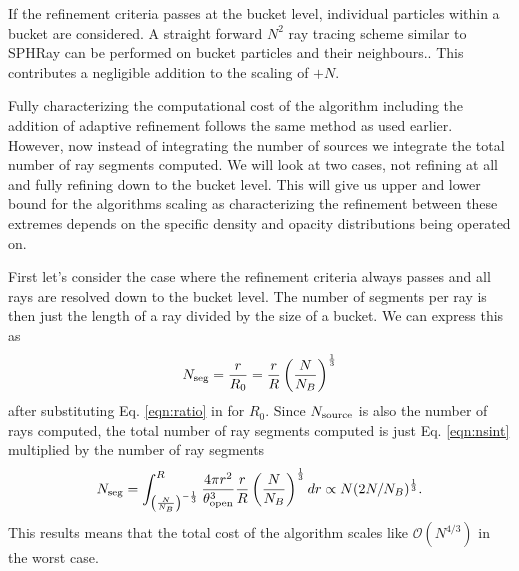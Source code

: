 \documentclass[fleq,usenatbib]{mnras}
\newcommand{\bigO}[1]{\mathcal{O}\left(#1\right)}
\newcommand{\NS}{N_{\rm source}}
\newcommand{\tO}{\theta_{\rm open}}
\begin{document}
If the refinement criteria passes at the bucket level, individual particles 
within a bucket are considered. A straight forward $N^2$ ray tracing scheme 
similar to SPHRay \citep{altayEt08} can be performed on bucket particles and 
their neighbours.. This contributes a negligible addition to the scaling of 
$+N$.

Fully characterizing the computational cost of the algorithm including the 
addition of adaptive refinement follows the same method as used earlier. 
However, now instead of integrating the number of sources we integrate the 
total number of ray segments computed. We will look at two cases, not refining 
at all and fully refining down to the bucket level. This will give us upper 
and lower bound for the algorithms scaling as characterizing the refinement 
between these extremes depends on the specific density and opacity 
distributions being operated on.

First let's consider the case where the refinement criteria always passes and 
all rays are resolved down to the bucket level. The number of segments per ray 
is then just the length of a ray divided by the size of a bucket. We can 
express this as
\begin{equation}
\label{eqn:nseg}
N_{\rm seg} = \frac{r}{R_0} = \frac{r}{R}\left(\frac{N}{N_B}\right)^\frac{1}{3}
\end{equation}
after substituting Eq. \ref{eqn:ratio} in for $R_0$. Since $\NS$ is also the 
number of rays computed, the total number of ray segments computed is just Eq. 
\ref{eqn:nsint} multiplied by the number of ray segments
\begin{equation}
\label{eqn:nsegint}
N_{\rm seg} = \int_{\left(\frac{N}{N_B}\right)^{-\frac{1}{3}}}^R 
\frac{4\pi r^2}{\tO^3}
\frac{r}{R}\left(\frac{N}{N_B}\right)^\frac{1}{3} dr
\propto N(2N/N_B)^\frac{1}{3}.
\end{equation}
This results means that the total cost of the algorithm scales like 
$\bigO{N^{4/3}}$ in the worst case.
\end{document}
